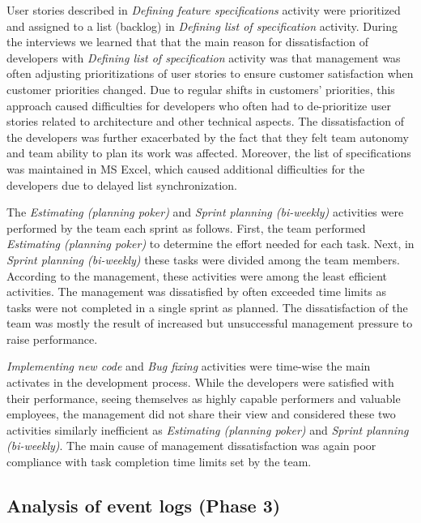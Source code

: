User stories described in \emph{Defining feature specifications} activity were prioritized and assigned to a list (backlog) in \emph{Defining list of specification} activity. During the interviews we learned that that the main reason for dissatisfaction of developers with \emph{Defining list of specification} activity was that management was often adjusting prioritizations of user stories to ensure customer satisfaction when customer priorities changed. Due to regular shifts in customers’ priorities, this approach caused difficulties for developers who often had to de-prioritize user stories related to architecture and other technical aspects. The dissatisfaction of the developers was further exacerbated by the fact that they felt team autonomy and team ability to plan its work was affected. Moreover, the list of specifications was maintained in MS Excel, which caused additional difficulties for the developers due to delayed list synchronization. 

The \emph{Estimating (planning poker)} and \emph{Sprint planning (bi-weekly)} activities were performed by the team each sprint as follows. First, the team performed \emph{Estimating (planning poker)} to determine the effort needed for each task. Next, in \emph{Sprint planning (bi-weekly)} these tasks were divided among the team members. According to the management, these activities were among the least efficient activities. The management was dissatisfied by often exceeded time limits as tasks were not completed in a single sprint as planned. The dissatisfaction of the team was mostly the result of increased but unsuccessful management pressure to raise performance.

\emph{Implementing new code} and \emph{Bug fixing} activities were time-wise the main activates in the development process. While the developers were satisfied with their performance, seeing themselves as highly capable performers and valuable employees, the management did not share their view and considered these two activities similarly inefficient as \emph{Estimating (planning poker)} and \emph{Sprint planning (bi-weekly)}. The main cause of management dissatisfaction was again poor compliance with task completion time limits set by the team.

\subsection{Analysis of event logs (Phase 3)}
\label{subsec:phase3}

